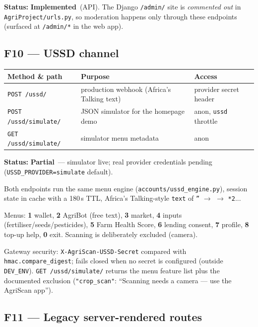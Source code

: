 \documentclass[11pt,a4paper]{article}
\newcommand{\done}{\textcolor{statusdone}{\textbf{Implemented}}}
\newcommand{\partialstatus}{\textcolor{statuspart}{\textbf{Partial}}}
\newcommand{\code}[1]{\texttt{\allowbreak #1\allowbreak}}
\begin{document}
\textbf{Status:} \done\ (API). The Django \code{/admin/} site is
\emph{commented out} in \code{AgriProject/urls.py}, so moderation happens
only through these endpoints (surfaced at \code{/admin/*} in the web app).

\subsection{F10 --- USSD channel}
\begin{center}
\small
\begin{tabularx}{\textwidth}{@{} l X l @{}}
\toprule
\textbf{Method \& path} & \textbf{Purpose} & \textbf{Access} \\
\midrule
\code{POST /ussd/}          & production webhook (Africa's Talking text) & provider secret header \\
\code{POST /ussd/simulate/} & JSON simulator for the homepage demo & anon, \code{ussd} throttle \\
\code{GET  /ussd/simulate/} & simulator menu metadata & anon \\
\bottomrule
\end{tabularx}
\end{center}

\textbf{Status:} \partialstatus\ --- simulator live; real provider
credentials pending (\code{USSD\_PROVIDER=simulate} default).

Both endpoints run the same menu engine (\code{accounts/ussd\_engine.py}),
session state in cache with a 180\,s TTL, Africa's Talking-style
\code{text} of \code{''} $\rightarrow$ \code{1} $\rightarrow$ \code{1*2}...

Menus: \textbf{1} wallet, \textbf{2} AgriBot (free text),
\textbf{3} market, \textbf{4} inputs (fertiliser/seeds/pesticides),
\textbf{5} Farm Health Score, \textbf{6} lending consent,
\textbf{7} profile, \textbf{8} top-up help, \textbf{0} exit.
Scanning is deliberately excluded (camera).

Gateway security: \code{X-AgriScan-USSD-Secret} compared with
\code{hmac.compare\_digest}; fails closed when no secret is configured
(outside \code{DEV\_ENV}). \code{GET /ussd/simulate/} returns the menu
feature list plus the documented exclusion
(\code{"crop\_scan"}: ``Scanning needs a camera --- use the AgriScan app'').

\subsection{F11 --- Legacy server-rendered routes}
\end{document}
